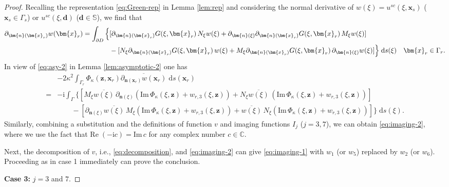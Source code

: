 \documentclass[10pt,a4paper]{article}
\numberwithin{equation}{section}
\begin{document}
\begin{proof}
  Recalling the representation \eqref{eq:Green-rep} in Lemma \ref{lem:rep} and considering the normal derivative of $w(\xi)=u^{sc}(\xi,\bm{x}_s)$ ($ \bm{ x }_s \in \Gamma_s$) or $u^{sc}(\xi,\bm{d})$ ($\bm{d}\in \mathbb{S} $), we find that
    \begin{align*}
\partial_{\bm{n}(\bm{ x }_r)} w(\bm{x}_r) = 
\int_{\partial D}\Big\{ &[\partial_{\bm{n}(\bm{ x }_r)}G(\xi,\bm{x}_r)\, N_{\xi} w(\xi )
                + \partial_{\bm{n}(\xi)}\partial_{\bm{n}(\bm{ x }_r)}G(\xi,\bm{x}_r)\, M_{\xi} w(\xi )  ]\\
&-[N_{\xi}\partial_{\bm{n}(\bm{ x }_r)} G(\xi,\bm{x}_r)\, w(\xi )
+ M_{\xi}\partial_{\bm{n}(\bm{ x }_r)}G(\xi,\bm{x}_r)\, \partial_{\bm{n}(\xi)} w(\xi ) ] 
  \Big\} {\;\rm d}s(\xi) \quad \bm{x}_r\in\Gamma_r.
  \end{align*}
  In view of  \eqref{eq:asy-2} in Lemma \ref{lem:asymptotic-2}  one has
    \begin{align*}
   & -2 \kappa^2 \int_{ \Gamma_{r} } \Phi_{\kappa}(\bm{ z },\bm{ x }_r) \overline{ \partial_{\bm{n}(\bm{ x }_r)}w(\bm{ x }_{r})} \;\mathrm{d}s(\bm{ x }_r) \\
    = &-\mathrm{ i }  \int_{ \Gamma } \Big\{ [M_{\xi}\overline{w(\xi)}\, \partial_{\bm{n}(\xi )}
        (\mathrm{Im}\, \Phi_{\kappa}(\xi,\bm{z}) + w_{r,3}(\xi,\bm{z}) )
        +N_{\xi } \overline{w(\xi)} \,
         (\mathrm{Im}\, \Phi_{\kappa}(\xi,\bm{z}) + w_{r,3}(\xi,\bm{z}) ) ]  \\
   & \qquad - [ \partial_{\bm{n}(\xi )}\overline{w(\xi)}\,  M_{\xi }
     ( \mathrm{Im}\, \Phi_{\kappa}(\xi,\bm{z}) + w_{r,3}(\xi,\bm{z})  )
     + \overline{w(\xi)} \, N_{\xi }
     ( \mathrm{Im}\, \Phi_{\kappa}(\xi,\bm{z}) + w_{r,3}(\xi,\bm{z}) )
     ]  \Big\} \;\mathrm{d}s(\xi).
  \end{align*}
  Similarly, combining a substitution and the definitions of  function $v$ and imaging functions $I_j$ ($j=3,7$), we can obtain \eqref{eq:imaging-2}, where we use the fact that $\mathrm{Re}\;(-\mathrm{ i } c )=\mathrm{Im}\, c$ for any complex number $c \in \mathbb{C}$.

  Next, the decomposition of $v$, i.e., \eqref{eq:decomposition}, and  \eqref{eq:imaging-2}  can give \eqref{eq:imaging-1} with $w_1$ (or $w_5$) replaced by $w_2$ (or $w_6$). Proceeding as in case 1 immediately can prove the conclusion.

  \textbf{Case 3:} $j=3$ and $7$.


\end{proof}
\end{document}
